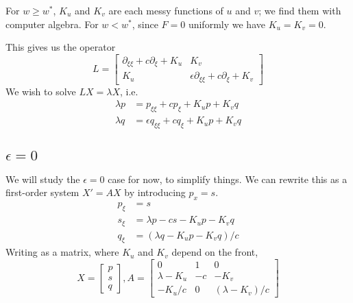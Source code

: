 \documentclass[10pt]{article}
\begin{document}
For $w \geq w^*$, $K_u$ and $K_v$ are each messy functions of $u$ and $v$; we find them with computer algebra.
For $w < w^*$, since $F = 0$ uniformly we have $K_u = K_v = 0$.

This gives us the operator
\[
L = \begin{bmatrix}
\partial_{\xi\xi} + c \partial_\xi + K_u  &  K_v  \\
K_u  &  \epsilon \partial_{\xi\xi} + c \partial_\xi + K_v
\end{bmatrix}
\]
We wish to solve $LX = \lambda X$, i.e.
\begin{align}
\lambda p &= p_{\xi\xi} + c p_\xi + K_u p + K_v q \\
\lambda q &= \epsilon q_{\xi\xi} + c q_\xi+ K_u p + K_v q
\end{align}

\subsection{$\epsilon = 0$}
We will study the $\epsilon=0$ case for now, to simplify things.
We can rewrite this as a first-order system $X' = AX$ by introducing $p_x = s$.
\begin{align}
p_\xi &= s \\
s_\xi &= \lambda p - c s - K_u p - K_v q \\
q_\xi &= (\lambda q - K_u p - K_v q)/c
\end{align}
Writing as a matrix, where $K_u$ and $K_v$ depend on the front,
\[
X = \begin{bmatrix}p\\s\\q\end{bmatrix},
A = \begin{bmatrix}
0 & 1 & 0 \\
\lambda - K_u  &  -c  &  -K_v \\
- K_u/c  &  0  &  (\lambda - K_v)/c
\end{bmatrix}
\]
\end{document}
